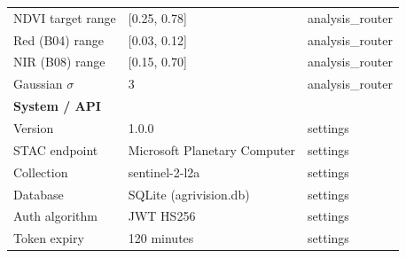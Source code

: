 \documentclass[12pt,a4paper,oneside]{report}
\begin{document}
\begin{table}[h]
\begin{tabular}{lll}
NDVI target range  & [0.25, 0.78]                 & analysis\_router \\
Red (B04) range    & [0.03, 0.12]                 & analysis\_router \\
NIR (B08) range    & [0.15, 0.70]                 & analysis\_router \\
Gaussian $\sigma$  & 3                            & analysis\_router \\[6pt]
\multicolumn{3}{l}{\textbf{System / API}}\\
Version            & 1.0.0                        & settings \\
STAC endpoint      & Microsoft Planetary Computer & settings \\
Collection         & sentinel-2-l2a               & settings \\
Database           & SQLite (agrivision.db)        & settings \\
Auth algorithm     & JWT HS256                    & settings \\
Token expiry       & 120 minutes                  & settings \\
\bottomrule
\end{tabular}
\end{table}
\end{document}
